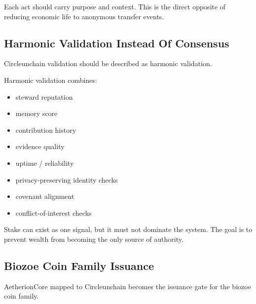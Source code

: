 ﻿\documentclass[12pt]{article}
\begin{document}
Each act should carry purpose and context. This is the direct opposite of reducing economic life to anonymous transfer events.

\subsection{Harmonic Validation Instead Of Consensus}


Circleunchain validation should be described as harmonic validation.

Harmonic validation combines:

\begin{itemize}
  \item steward reputation
\end{itemize}
\begin{itemize}
  \item memory score
\end{itemize}
\begin{itemize}
  \item contribution history
\end{itemize}
\begin{itemize}
  \item evidence quality
\end{itemize}
\begin{itemize}
  \item uptime / reliability
\end{itemize}
\begin{itemize}
  \item privacy-preserving identity checks
\end{itemize}
\begin{itemize}
  \item covenant alignment
\end{itemize}
\begin{itemize}
  \item conflict-of-interest checks
\end{itemize}

Stake can exist as one signal, but it must not dominate the system. The goal is to prevent wealth from becoming the only source of authority.

\subsection{Biozoe Coin Family Issuance}


AetherionCore mapped to Circleunchain becomes the issuance gate for the biozoe coin family.
\end{document}
